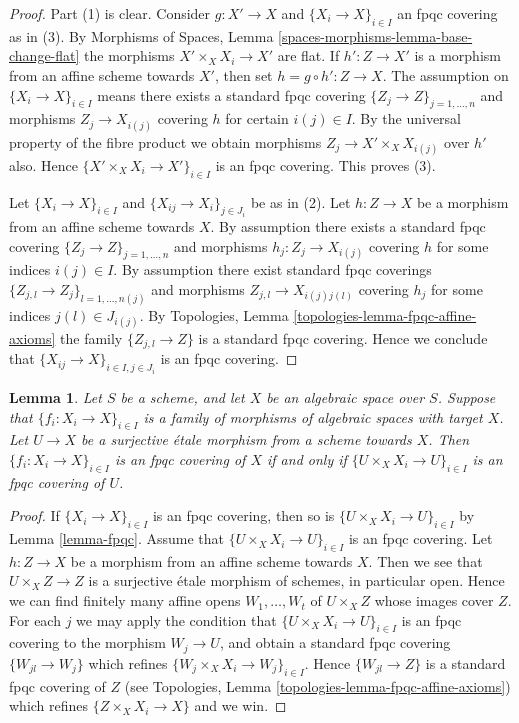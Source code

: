 \documentclass{stacks-project}
\theoremstyle{plain}
\newtheorem{lemma}[subsection]{Lemma}
\theoremstyle{definition}
\theoremstyle{remark}
\numberwithin{equation}{subsection}
\begin{document}
\begin{proof}
Part (1) is clear. Consider $g : X' \to X$ and
$\{X_i \to X\}_{i\in I}$ an fpqc covering as in (3). By
Morphisms of Spaces, Lemma \ref{spaces-morphisms-lemma-base-change-flat}
the morphisms $X' \times_X X_i \to X'$
are flat. If $h' : Z \to X'$ is a morphism from an affine scheme
towards $X'$, then set $h = g \circ h' : Z \to X$. The assumption
on $\{X_i \to X\}_{i\in I}$ means there exists a standard fpqc covering
$\{Z_j \to Z\}_{j = 1, \ldots, n}$ and morphisms $Z_j \to X_{i(j)}$ covering
$h$ for certain $i(j) \in I$. By the universal property of the fibre product
we obtain morphisms $Z_j \to X' \times_X X_{i(j)}$ over $h'$ also.
Hence $\{X' \times_X X_i \to X'\}_{i\in I}$ is an fpqc covering.
This proves (3).

\medskip\noindent
Let $\{X_i \to X\}_{i\in I}$ and $\{X_{ij} \to X_i\}_{j\in J_i}$ be as
in (2). Let $h : Z \to X$ be a morphism from an affine scheme towards $X$.
By assumption there exists a standard fpqc covering
$\{Z_j \to Z\}_{j = 1, \ldots, n}$ and morphisms $h_j : Z_j \to X_{i(j)}$
covering $h$ for some indices $i(j) \in I$. By assumption there exist
standard fpqc coverings
$\{Z_{j, l} \to Z_j\}_{l = 1, \ldots, n(j)}$
and morphisms $Z_{j, l} \to X_{i(j)j(l)}$ covering
$h_j$ for some indices $j(l) \in J_{i(j)}$. By
Topologies, Lemma \ref{topologies-lemma-fpqc-affine-axioms}
the family $\{Z_{j, l} \to Z\}$ is a standard fpqc covering.
Hence we conclude that $\{X_{ij} \to X\}_{i \in I, j\in J_i}$
is an fpqc covering.
\end{proof}

\begin{lemma}
\label{lemma-recognize-fpqc-covering}
Let $S$ be a scheme, and let $X$ be an algebraic space over $S$.
Suppose that $\{f_i : X_i \to X\}_{i \in I}$ is a family of morphisms of
algebraic spaces with target $X$. Let $U \to X$ be a surjective
\'etale morphism from a scheme towards $X$. Then
$\{f_i : X_i \to X\}_{i \in I}$ is an fpqc covering of $X$ if and only
if $\{U \times_X X_i \to U\}_{i \in I}$ is an fpqc covering of $U$.
\end{lemma}

\begin{proof}
If $\{X_i \to X\}_{i \in I}$ is an fpqc covering, then so is
$\{U \times_X X_i \to U\}_{i \in I}$ by Lemma \ref{lemma-fpqc}.
Assume that $\{U \times_X X_i \to U\}_{i \in I}$ is an fpqc covering.
Let $h : Z \to X$ be a morphism from an affine scheme towards $X$.
Then we see that $U \times_X Z \to Z$ is a surjective \'etale morphism
of schemes, in particular open. Hence we can find finitely many affine opens
$W_1, \ldots, W_t$ of $U \times_X Z$ whose images cover $Z$.
For each $j$ we may apply the condition that
$\{U \times_X X_i \to U\}_{i \in I}$ is an fpqc covering
to the morphism $W_j \to U$, and obtain a standard fpqc covering
$\{W_{jl} \to W_j\}$ which refines $\{W_j \times_X X_i \to W_j\}_{i \in I}$.
Hence $\{W_{jl} \to Z\}$ is a standard fpqc covering of $Z$
(see
Topologies, Lemma \ref{topologies-lemma-fpqc-affine-axioms})
which refines $\{Z \times_X X_i \to X\}$ and we win.
\end{proof}
\end{document}
